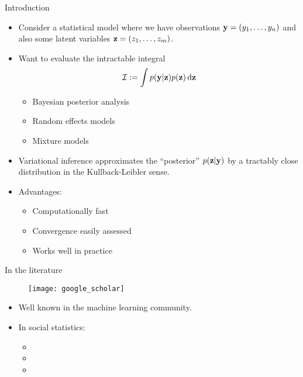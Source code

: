 \begin{frame}{Introduction}
  \begin{itemize}
    \item Consider a statistical model where we have observations ${\mathbf y} = (y_1, \dots, y_n)$ and also some latent variables ${\mathbf z} = (z_1, \dots, z_m)$.
    \pause  
    \item Want to evaluate the intractable integral
    \[
      {\mathcal I} := \int p({\mathbf y}|{\mathbf z})p({\mathbf z}) \, \text{d}{\mathbf z}
    \]
    \begin{itemize}
      \item Bayesian posterior analysis
      \item Random effects models 
      \item Mixture models
    \end{itemize}
    \pause
    \item Variational inference approximates the ``posterior'' $p({\mathbf z}|{\mathbf y})$ by a tractably close distribution in the Kullback-Leibler sense.
    \item<4-> Advantages:
    \begin{itemize}
      \item Computationally fast
      \item Convergence easily assessed
      \item Works well in practice
    \end{itemize}
  \end{itemize}
\end{frame}

\begin{frame}{In the literature}
  \vspace{-15pt}
  \begin{figure}[h]
    \texttt{[image: google\_scholar]}
  \end{figure}
  \vspace{-15pt}
  \begin{itemize}
    \item Well known in the machine learning community.
    \pause
    \item In social statistics:
    \begin{itemize}\footnotesize
      \item {}
      \item {}
      \item {}
    \end{itemize}
  \end{itemize}
\end{frame}


